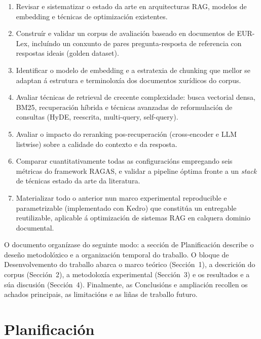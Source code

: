 \documentclass[11pt, a4paper, oneside]{report}
\begin{document}
\begin{enumerate}[label=\textbf{OE\arabic*.}]
  \item Revisar e sistematizar o estado da arte en arquitecturas RAG, modelos de
    embedding e técnicas de optimización existentes.
  \item Construír e validar un corpus de avaliación baseado en documentos de EUR-Lex,
    incluíndo un conxunto de pares pregunta-resposta de referencia con respostas ideais
    (golden dataset).
  \item Identificar o modelo de embedding e a estratexia de chunking que mellor se
    adaptan á estrutura e terminoloxía dos documentos xurídicos do corpus.
  \item Avaliar técnicas de retrieval de crecente complexidade: busca vectorial densa,
    BM25, recuperación híbrida e técnicas avanzadas de reformulación de consultas
    (HyDE, reescrita, multi-query, self-query).
  \item Avaliar o impacto do reranking pos-recuperación (cross-encoder e LLM listwise)
    sobre a calidade do contexto e da resposta.
  \item Comparar cuantitativamente todas as configuracións empregando seis métricas
    do framework RAGAS, e validar a pipeline óptima fronte a un \textit{stack} de
    técnicas estado da arte da literatura.
  \item Materializar todo o anterior nun marco experimental reproducible e parametrizable
    (implementado con Kedro) que constitúa un entregable reutilizable, aplicable á
    optimización de sistemas RAG en calquera dominio documental.
\end{enumerate}

\vspace{0.8em}
\noindent O documento organízase do seguinte modo: a sección de Planificación describe
o deseño metodolóxico e a organización temporal do traballo. O bloque de Desenvolvemento
do traballo abarca o marco teórico (Sección~1), a descrición do corpus (Sección~2),
a metodoloxía experimental (Sección~3) e os resultados e a súa discusión (Sección~4).
Finalmente, as Conclusións e ampliación recollen os achados principais, as limitacións
e as liñas de traballo futuro.

\clearpage

\chapter*{Planificación}
\end{document}
